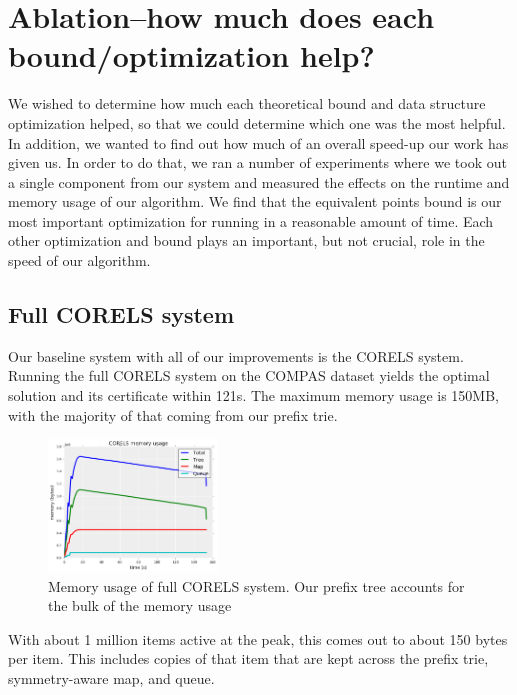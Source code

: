 \section{Ablation--how much does each bound/optimization help?}

We wished to determine how much each theoretical bound and data structure optimization helped, so that we could determine which one was the most helpful.
In addition, we wanted to find out how much of an overall speed-up our work has given us.
In order to do that, we ran a number of experiments where we took out a single component from our system and measured the effects on the runtime and memory usage of our algorithm.
We find that the equivalent points bound is our most important optimization for running in a reasonable amount of time.
Each other optimization and bound plays an important, but not crucial, role in the speed of our algorithm.

\subsection{Full CORELS system}

Our baseline system with all of our improvements is the CORELS system.
Running the full CORELS system on the COMPAS dataset yields the optimal solution and its certificate within 121s.
The maximum memory usage is 150MB, with the majority of that coming from our prefix trie.

\begin{figure}[t!]
\begin{center}
\includegraphics[width=0.4\textwidth]{figs/corels_mem.png}
\end{center}
\caption{Memory usage of full CORELS system. Our prefix tree accounts for the bulk of the memory usage}
\label{fig:corels-mem}
\end{figure}

With about 1 million items active at the peak, this comes out to about 150 bytes per item.
This includes copies of that item that are kept across the prefix trie, symmetry-aware map, and queue.

